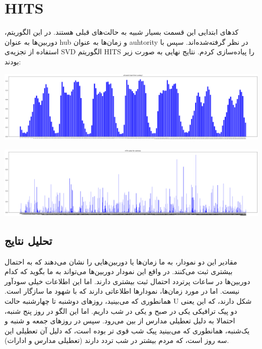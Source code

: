 \section{HITS}

کدهای ابتدایی این قسمت بسیار شبیه به حالت‌های قبلی هستند. در این الگوریتم، 
دوربین‌ها به عنوان
hub
 و زمان‌ها به عنوان 
auhtority
در نظر گرفته‌شده‌اند. سپس با استفاده از تجزیه‌ی 
SVD
الگوریتم 
HITS
را پیاده‌سازی کردم. نتایج نهایی به صورت زیر بودند: 

\includegraphics[scale=0.2]{images/HITS/1.png}

\includegraphics[scale=0.2]{images/HITS/2.png}


\subsection{تحلیل نتایج}
مقادیر این دو نمودار، به ما زمان‌ها یا دوربین‌هایی را نشان‌ می‌دهند که به احتمال بیشتری ثبت می‌کنند. در واقع این نمودار دوربین‌ها می‌تواند 
به ما بگوید که کدام دوربین‌ها در ساعات پرتردد احتمال ثبت بیشتری دارند. اما این اطلاعات خیلی سود‌آور نیست. 
اما در مورد زمان‌ها، نمودار‌ها اطلاعاتی دارند که با شهود ما سازگار است. همانطوری که می‌بینید، روز‌های دوشنبه تا 
چهارشنبه حالت 
U
شکل دارند، که این یعنی دو پیک ترافیکی یکی در صبح و یکی در شب داریم. اما این 
الگو در روز پنج شنبه، احتمالا به دلیل تعطیلی مدارس از بین می‌رود. سپس 
در روز‌های جمعه و شنبه و یک‌شنبه، همانطوری که می‌بینید پیک شب قوی تر بوده است، که دلیل آن 
تعطیلی این سه روز است، که مردم بیشتر در شب تردد دارند (تعطیلی مدارس و ادارات). 
